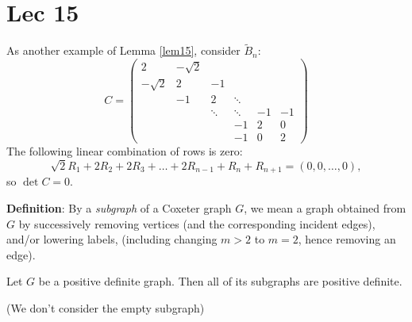 \section{Lec 15}

As another example of Lemma \ref{lem15}, consider $\widetilde{B}_n$:
\[
    C = \begin{pmatrix}
        2 & -\sqrt{2} &  & \\
        -\sqrt{2} & 2 & -1 & \\
         & -1 & 2 & \ddots & \\
         & & \ddots & \ddots & -1 & -1 \\
         & & & -1 & 2 & 0 \\
         & & & -1 & 0 & 2
    \end{pmatrix}
\]
The following linear combination of rows is zero:
\[
    \sqrt{2} R_1 + 2 R_2 + 2 R_3 + \dots + 2 R_{n-1} + R_n + R_{n+1} = (0, 0, \dots, 0),
\]
so $\det C = 0$.

{\bf Definition}: By a {\em subgraph} of a Coxeter graph $G$, we mean a graph
obtained from $G$ by successively removing vertices (and the corresponding
incident edges), and/or lowering labels, (including changing $m>2$ to $m=2$,
hence removing an edge).


\begin{proposition} \label{prop16}
Let $G$ be a positive definite graph. Then all of its subgraphs are positive
definite.
\end{proposition}

(We don't consider the empty subgraph)

